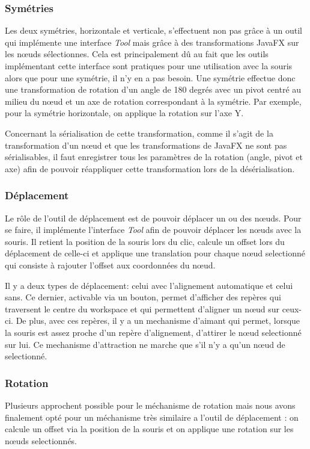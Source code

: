\subsubsection{Symétries}

Les deux symétries, horizontale et verticale, s'effectuent non pas grâce à un outil qui implémente une interface \textit{Tool} mais grâce à des transformations JavaFX sur les n\oe uds sélectionnes. Cela est principalement dû au fait que les outils implémentant cette interface sont pratiques pour une utilisation avec la souris alors que pour une symétrie, il n'y en a pas besoin. Une symétrie effectue donc une transformation de rotation d'un angle de 180 degrés avec un pivot centré au milieu du n\oe ud et un axe de rotation correspondant à la symétrie. Par exemple, pour la symétrie horizontale, on applique la rotation sur l'axe Y.

Concernant la sérialisation de cette transformation, comme il s'agit de la transformation d'un n\oe ud et que les transformations de JavaFX ne sont pas sérialisables, il faut enregistrer tous les paramètres de la rotation (angle, pivot et axe) afin de pouvoir réappliquer cette transformation lors de la désérialisation.
\subsubsection{Déplacement}
Le rôle de l'outil de déplacement est de pouvoir déplacer un ou des n\oe uds. Pour se faire, il implémente l'interface \textit{Tool} afin de pouvoir déplacer les n\oe uds avec la souris. Il retient la position de la souris lors du clic, calcule un offset lors du déplacement de celle-ci et applique une translation pour chaque n\oe ud selectionné qui consiste à rajouter l'offset aux coordonnées du n\oe ud.

 Il y a deux types de déplacement: celui avec l'alignement automatique et celui sans. Ce dernier, activable via un bouton, permet d'afficher des repères qui traversent le centre du workspace et qui permettent d'aligner un n\oe ud sur ceux-ci. De plus, avec ces repères, il y a un mechanisme d'aimant qui permet, lorsque la souris est assez proche d'un repère d'alignement, d'attirer le n\oe ud selectionné sur lui. Ce mechanisme d'attraction ne marche que s'il n'y a qu'un n\oe ud de selectionné.
\subsubsection{Rotation}
Plusieurs approchent possible pour le méchanisme de rotation mais nous avons finalement opté pour un méchanisme très similaire a l'outil de déplacement : on calcule un offset via la position de la souris et on applique une rotation sur les n\oe uds selectionnés.
